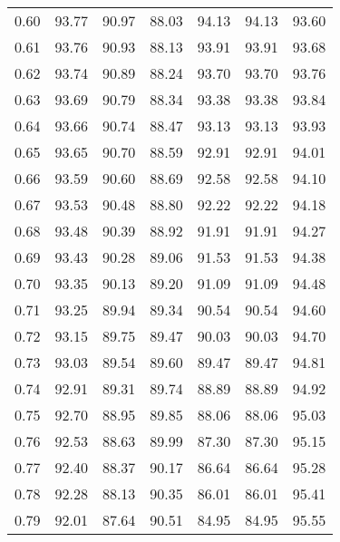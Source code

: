 \begin{tabular}{|c|c|c|c|c|c|c|}
      0.60 &     93.77 &     90.97 &      88.03 &   94.13 &      94.13 &         93.60 \\
      0.61 &     93.76 &     90.93 &      88.13 &   93.91 &      93.91 &         93.68 \\
      0.62 &     93.74 &     90.89 &      88.24 &   93.70 &      93.70 &         93.76 \\
      0.63 &     93.69 &     90.79 &      88.34 &   93.38 &      93.38 &         93.84 \\
      0.64 &     93.66 &     90.74 &      88.47 &   93.13 &      93.13 &         93.93 \\
      0.65 &     93.65 &     90.70 &      88.59 &   92.91 &      92.91 &         94.01 \\
      0.66 &     93.59 &     90.60 &      88.69 &   92.58 &      92.58 &         94.10 \\
      0.67 &     93.53 &     90.48 &      88.80 &   92.22 &      92.22 &         94.18 \\
      0.68 &     93.48 &     90.39 &      88.92 &   91.91 &      91.91 &         94.27 \\
      0.69 &     93.43 &     90.28 &      89.06 &   91.53 &      91.53 &         94.38 \\
      0.70 &     93.35 &     90.13 &      89.20 &   91.09 &      91.09 &         94.48 \\
      0.71 &     93.25 &     89.94 &      89.34 &   90.54 &      90.54 &         94.60 \\
      0.72 &     93.15 &     89.75 &      89.47 &   90.03 &      90.03 &         94.70 \\
      0.73 &     93.03 &     89.54 &      89.60 &   89.47 &      89.47 &         94.81 \\
      0.74 &     92.91 &     89.31 &      89.74 &   88.89 &      88.89 &         94.92 \\
      0.75 &     92.70 &     88.95 &      89.85 &   88.06 &      88.06 &         95.03 \\
      0.76 &     92.53 &     88.63 &      89.99 &   87.30 &      87.30 &         95.15 \\
      0.77 &     92.40 &     88.37 &      90.17 &   86.64 &      86.64 &         95.28 \\
      0.78 &     92.28 &     88.13 &      90.35 &   86.01 &      86.01 &         95.41 \\
      0.79 &     92.01 &     87.64 &      90.51 &   84.95 &      84.95 &         95.55 \\

\end{tabular}
